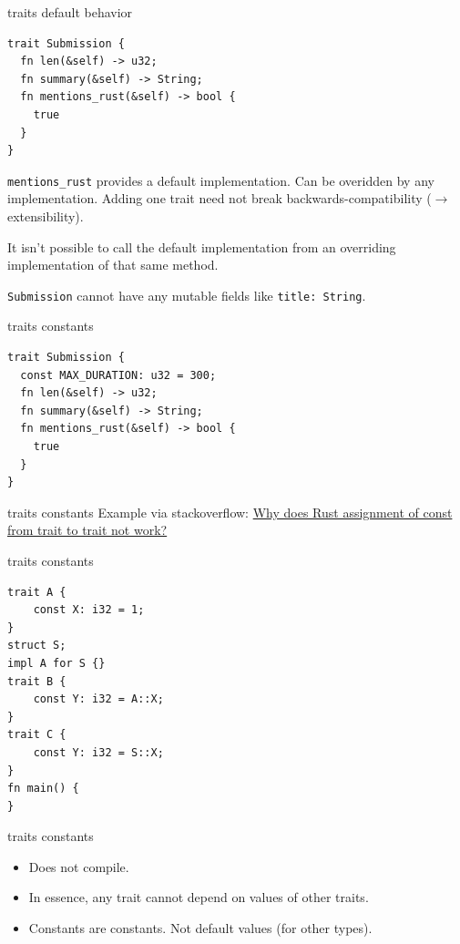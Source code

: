 \documentclass{beamer}
\begin{document}
\begin{frame}[fragile]{traits default behavior}
  \begin{verbatim}
trait Submission {
  fn len(&self) -> u32;
  fn summary(&self) -> String;
  fn mentions_rust(&self) -> bool {
    true
  }
}
  \end{verbatim}
  \texttt{mentions_rust} provides a default implementation. Can be overidden by any implementation.
  Adding one trait need not break backwards-compatibility ($\rightarrow$ extensibility).

  It isn’t possible to call the default implementation from an overriding implementation of that same method.

  \texttt{Submission} cannot have any mutable fields like \texttt{title: String}.
\end{frame}

\begin{frame}[fragile]{traits constants}
  \begin{verbatim}
trait Submission {
  const MAX_DURATION: u32 = 300;
  fn len(&self) -> u32;
  fn summary(&self) -> String;
  fn mentions_rust(&self) -> bool {
    true
  }
}
  \end{verbatim}
\end{frame}

\begin{frame}[fragile]{traits constants}
  Example via stackoverflow: \href{https://stackoverflow.com/q/56718406}{Why does Rust assignment of const from trait to trait not work?}
\end{frame}

\begin{frame}[fragile]{traits constants}
  \begin{verbatim}
trait A {
    const X: i32 = 1;
}
struct S;
impl A for S {}
trait B {
    const Y: i32 = A::X;
}
trait C {
    const Y: i32 = S::X;
}
fn main() {
}
  \end{verbatim}
\end{frame}

\begin{frame}[fragile]{traits constants}
  \begin{itemize}
    \item Does not compile.
    \item In essence, any trait cannot depend on values of other traits.
    \item Constants are constants. Not default values (for other types).
  \end{itemize}
\end{frame}
\end{document}
